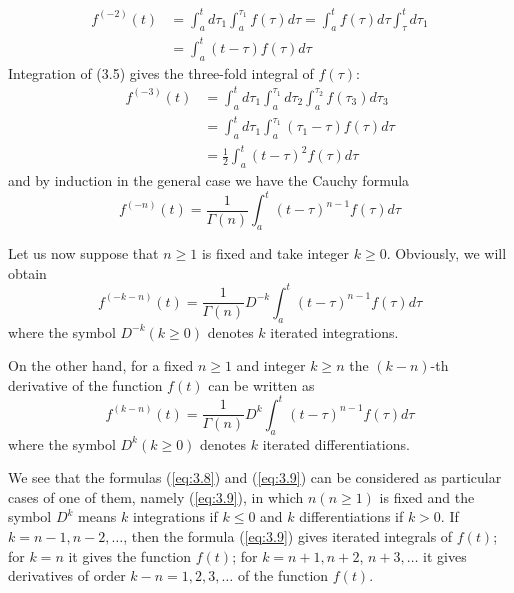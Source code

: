 \documentclass[a4paper,14pt,oneside]{book}
\theoremstyle{plain}
\theoremstyle{definition}
\theoremstyle{remark}
\begin{document}
\begin{center}
\begin{flushleft}
\begin{align}
f^{(-2)}(t) &=\int_{a}^{t} d \tau_{1} \int_{a}^{\tau_{1}} f(\tau) d \tau=\int_{a}^{t} f(\tau) d \tau \int_{\tau}^{t} d \tau_{1}\nonumber\\
&=\int_{a}^{t}(t-\tau) f(\tau) d \tau
\end{align}
Integration of (3.5) gives the three-fold integral of $f(\tau)$:
\begin{align}
f^{(-3)}(t) &=\int_{a}^{t} d \tau_{1} \int_{a}^{\tau_{1}} d \tau_{2} \int_{a}^{\tau_{2}} f\left(\tau_{3}\right) d \tau_{3} \nonumber\\
&=\int_{a}^{t} d \tau_{1} \int_{a}^{\tau_{1}}\left(\tau_{1}-\tau\right) f(\tau) d \tau \nonumber\\
&=\frac{1}{2} \int_{a}^{t}(t-\tau)^{2} f(\tau) d \tau
\end{align}
and by induction in the general case we have the Cauchy formula
\begin{equation}\label{eq:3.7}
f^{(-n)}(t)=\frac{1}{\Gamma(n)} \int_{a}^{t}(t-\tau)^{n-1} f(\tau) d \tau
\end{equation}
\par Let us now suppose that $n \geq 1$ is fixed and take integer $k \geq 0$. Obviously, we will obtain
\begin{equation}\label{eq:3.8}
f^{(-k-n)}(t)=\frac{1}{\Gamma(n)} D^{-k} \int_{a}^{t}(t-\tau)^{n-1} f(\tau) d \tau
\end{equation}
where the symbol $D^{-k} (k \geq 0)$ denotes $k$ iterated integrations.
\par On the other hand, for a fixed $n \geq 1$ and integer $k \geq n$ the $(k-n)$-th derivative of the function $f(t)$ can be written as
\begin{equation}\label{eq:3.9}
f^{(k-n)}(t)=\frac{1}{\Gamma(n)} D^{k} \int_{a}^{t}(t-\tau)^{n-1} f(\tau) d \tau
\end{equation}
where the symbol $D^{k}(k \geq 0)$ denotes $k$ iterated differentiations.
\par We see that the formulas (\ref{eq:3.8}) and (\ref{eq:3.9}) can be considered as particular cases of one of them, namely (\ref{eq:3.9}), in which $n(n \geq 1)$ is fixed and the symbol $D^{k}$ means $k$ integrations if $k \leq 0$ and $k$ differentiations if $k>0$. If $k=n-1, n-2, \ldots$, then the formula (\ref{eq:3.9}) gives iterated integrals of $f(t)$; for $k=n$ it gives the function $f(t)$; for $k=n+1, n+2$, $n+3, \ldots$ it gives derivatives of order $k-n=1,2,3, \ldots$ of the function $f(t)$.


\end{flushleft}
\end{center}
\end{document}
